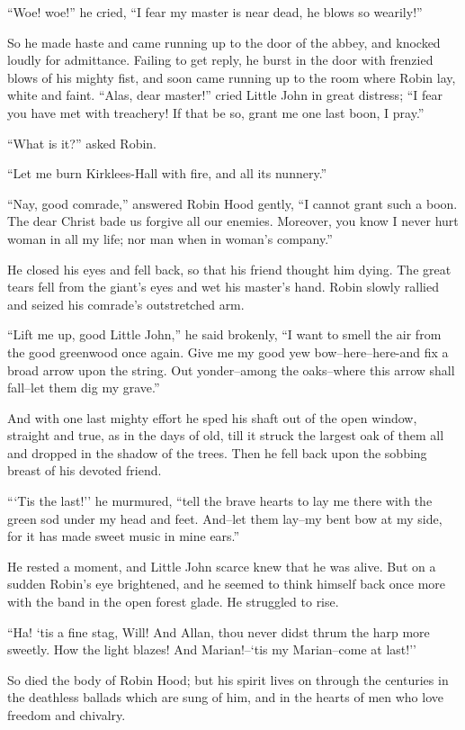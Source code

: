 ``Woe! woe!'' he cried, ``I fear my master is near dead, he blows so
wearily!''

So he made haste and came running up to the door of the abbey, and
knocked loudly for admittance. Failing to get reply, he burst in the
door with frenzied blows of his mighty fist, and soon came running up to
the room where Robin lay, white and faint. ``Alas, dear master!'' cried
Little John in great distress; ``I fear you have met with treachery! If
that be so, grant me one last boon, I pray.''

``What is it?'' asked Robin.

``Let me burn Kirklees-Hall with fire, and all its nunnery.''

``Nay, good comrade,'' answered Robin Hood gently, ``I cannot grant such
a boon. The dear Christ bade us forgive all our enemies. Moreover, you
know I never hurt woman in all my life; nor man when in woman's
company.''

He closed his eyes and fell back, so that his friend thought him dying.
The great tears fell from the giant's eyes and wet his master's hand.
Robin slowly rallied and seized his comrade's outstretched arm.

``Lift me up, good Little John,'' he said brokenly, ``I want to smell
the air from the good greenwood once again. Give me my good yew
bow--here--here-and fix a broad arrow upon the string. Out yonder--among
the oaks--where this arrow shall fall--let them dig my grave.''

And with one last mighty effort he sped his shaft out of the open
window, straight and true, as in the days of old, till it struck the
largest oak of them all and dropped in the shadow of the trees. Then he
fell back upon the sobbing breast of his devoted friend.

```Tis the last!'' he murmured, ``tell the brave hearts to lay me there
with the green sod under my head and feet. And--let them lay--my bent
bow at my side, for it has made sweet music in mine ears.''

He rested a moment, and Little John scarce knew that he was alive. But
on a sudden Robin's eye brightened, and he seemed to think himself back
once more with the band in the open forest glade. He struggled to rise.

``Ha! `tis a fine stag, Will! And Allan, thou never didst thrum the harp
more sweetly. How the light blazes! And Marian!--`tis my Marian--come at
last!''

So died the body of Robin Hood; but his spirit lives on through the
centuries in the deathless ballads which are sung of him, and in the
hearts of men who love freedom and chivalry.

